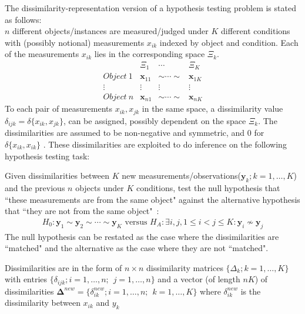 \documentclass[11pt]{article} %
\begin{document}
The dissimilarity-representation version of a hypothesis testing problem is stated as follows:\\
$n$ different objects/instances are measured/judged under $K$ different conditions with (possibly notional) measurements $x_{ik}$ indexed by object and condition. Each of the measurements $x_{ik}$ lies in  the corresponding space $\Xi_k$. 
\[  \begin{array}{cccc}
        & \Xi_1 & \cdots & \Xi_K\\
        Object ~ 1 & \bm{x}_{11} & \sim \cdots \sim & \bm{x}_{1K} \\
        \vdots & \vdots & \vdots & \vdots \\
        Object ~ n & \bm{x}_{n1} & \sim \cdots \sim & \bm{x}_{nK}
      \end{array}      
\]
To each pair of measurements $x_{ik},x_{jk}$ in the same space, a dissimilarity value $\delta_{ijk}=\delta\{x_{ik},x_{jk}\}$, can be assigned,  possibly dependent on the space $\Xi_k$. The dissimilarities are assumed to be non-negative and  symmetric, and 0 for $\delta\{x_{ik},x_{ik}\}$   . These  dissimilarities are exploited to do inference on the following hypothesis testing task:

 Given dissimilarities between  $K$ new measurements/observations($\bm{y}_{k};k=1,\ldots,K$) and the previous 
$n$ objects under $K$ conditions,    test the null hypothesis  that ``these measurements are from the same  object"  against the alternative hypothesis that ``they are not  from the same  object"~\cite{JOFC}:
    \[
\begin{array}{l}
    H_0: \bm{y}_{1} \sim \bm{y}_{2} \sim \cdots \sim \bm{y}_{K}
 \text{ versus } 
 H_A: \exists i, j , 1\leq i < j \leq K :\bm{y}_{i} \nsim \bm{y}_{j}  
\end{array}
\]
 The null hypothesis can be restated as the case where the dissimilarities are ``matched" and the alternative as the case where they are not ``matched".

Dissimilarities are in the form  of $n \times n$  dissimilarity matrices $\{\Delta_k;k=1,\ldots,K\}$ with entries $\{\delta_{ijk} ;  i=1,\ldots,n;\hspace{5pt} j=1,\ldots,n\}$  and a  vector (of length $nK$) of dissimilarities  $\mathbf{\Delta}^{new}=\{ \delta_{ik}^{new}; i=1,\ldots, n;\hspace{5pt} k=1,\ldots,K\}  $  where $\delta_{ik}^{new} $ is the dissimilarity  between  $x_{ik}$ and $y_k$
\end{document}
